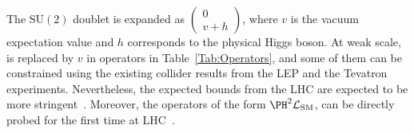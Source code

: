 \documentclass[a4paper,11pt]{article}
\begin{document}

The $\textrm{SU}(2)$ doublet \PH is expanded as $\begin{pmatrix} 0 \\ v+h \end{pmatrix}$, where $v$ is the vacuum expectation value  and $h$ corresponds to the physical Higgs boson.
At weak scale,  \PH is replaced by $v$ in operators in Table~\ref{Tab:Operators}, and some of them can be constrained using the existing collider results from  the LEP and the Tevatron experiments.
Nevertheless, the expected bounds from the LHC are expected to be more stringent~\cite{Ellis:2014jta,Grojean:2018dqj}.
Moreover, the operators of the form ${\PH}^2\mathcal{L}_{\text{SM}}$, can be directly probed for the first time at LHC~\cite{Gupta:2014rxa}. 
\end{document}
